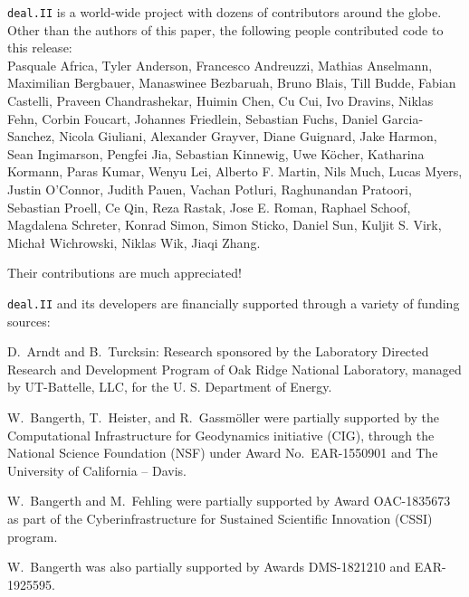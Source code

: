 \documentclass{ansarticle-preprint}
\newcommand{\specialword}[1]{\texttt{#1}}
\newcommand{\dealii}{{\specialword{deal.II}}\xspace}
\begin{document}
\dealii{} is a world-wide project with dozens of contributors around the
globe. Other than the authors of this paper, the following people
contributed code to this release:\\
%
%

Pasquale      Africa,
Tyler         Anderson,
Francesco     Andreuzzi,
Mathias       Anselmann,
Maximilian    Bergbauer,
Manaswinee    Bezbaruah,
Bruno         Blais,
Till          Budde,
Fabian        Castelli,
Praveen       Chandrashekar,
Huimin        Chen,
Cu            Cui,
Ivo           Dravins,
Niklas        Fehn,
Corbin        Foucart,
Johannes      Friedlein,
Sebastian     Fuchs,
Daniel        Garcia-Sanchez,
Nicola        Giuliani,
Alexander     Grayver,
Diane         Guignard,
Jake          Harmon,
Sean          Ingimarson,
Pengfei       Jia,
Sebastian     Kinnewig,
Uwe           K{\"o}cher,
Katharina     Kormann,
Paras         Kumar,
Wenyu         Lei,
Alberto F.    Martin,
Nils          Much,
Lucas         Myers,
Justin        O'Connor,
Judith        Pauen,
Vachan        Potluri,
Raghunandan   Pratoori,
Sebastian     Proell,
Ce            Qin,
Reza          Rastak,
Jose E.       Roman,
Raphael       Schoof,
Magdalena     Schreter,
Konrad        Simon,
Simon         Sticko,
Daniel        Sun,
Kuljit S.     Virk,
Michał        Wichrowski,
Niklas        Wik,
Jiaqi         Zhang.


Their contributions are much appreciated!


\bigskip

\dealii{} and its developers are financially supported through a
variety of funding sources:


D.~Arndt and B.~Turcksin: Research sponsored by the Laboratory Directed Research and
Development Program of Oak Ridge National Laboratory, managed by UT-Battelle,
LLC, for the U. S. Department of Energy.

W.~Bangerth, T.~Heister, and R.~Gassm{\"o}ller were partially
supported by the Computational Infrastructure for Geodynamics initiative
(CIG), through the National Science Foundation (NSF) under Award
No.~EAR-1550901 and The University of California -- Davis.

W.~Bangerth and M.~Fehling were partially supported by Award OAC-1835673
as part of the Cyberinfrastructure for Sustained Scientific Innovation (CSSI)
program.

W.~Bangerth was also partially supported by Awards DMS-1821210 and EAR-1925595.
\end{document}
